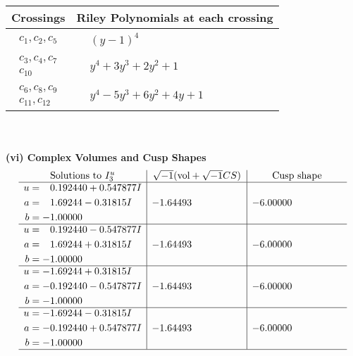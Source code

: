 \documentclass[1p]{elsarticle_modified}
\theoremstyle{definition}
\newcommand{\I}{\sqrt{-1}}
\begin{document}
\begin{tabular}{m{50pt}|m{274pt}}
Crossings & \hspace{64pt}Riley Polynomials at each crossing \\
\hline $$\begin{aligned}c_{1},c_{2},c_{5}\end{aligned}$$&$\begin{aligned}
&(y-1)^4
\end{aligned}$\\
\hline $$\begin{aligned}c_{3},c_{4},c_{7}\\c_{10}\end{aligned}$$&$\begin{aligned}
&y^4+3 y^3+2 y^2+1
\end{aligned}$\\
\hline $$\begin{aligned}c_{6},c_{8},c_{9}\\c_{11},c_{12}\end{aligned}$$&$\begin{aligned}
&y^4-5 y^3+6 y^2+4 y+1
\end{aligned}$\\
\hline
\end{tabular}\\~\\
\newpage\flushleft \textbf{(vi) Complex Volumes and Cusp Shapes}
$$\begin{array}{c|c|c}  
\text{Solutions to }I^u_{3}& \I (\text{vol} + \sqrt{-1}CS) & \text{Cusp shape}\\
 \hline 
\begin{aligned}
u &= \phantom{-}0.192440 + 0.547877 I \\
a &= \phantom{-}1.69244 - 0.31815 I \\
b &= -1.00000\phantom{ +0.000000I}\end{aligned}
 & -1.64493\phantom{ +0.000000I} & -6.00000\phantom{ +0.000000I} \\ \hline\begin{aligned}
u &= \phantom{-}0.192440 - 0.547877 I \\
a &= \phantom{-}1.69244 + 0.31815 I \\
b &= -1.00000\phantom{ +0.000000I}\end{aligned}
 & -1.64493\phantom{ +0.000000I} & -6.00000\phantom{ +0.000000I} \\ \hline\begin{aligned}
u &= -1.69244 + 0.31815 I \\
a &= -0.192440 - 0.547877 I \\
b &= -1.00000\phantom{ +0.000000I}\end{aligned}
 & -1.64493\phantom{ +0.000000I} & -6.00000\phantom{ +0.000000I} \\ \hline\begin{aligned}
u &= -1.69244 - 0.31815 I \\
a &= -0.192440 + 0.547877 I \\
b &= -1.00000\phantom{ +0.000000I}\end{aligned}
 & -1.64493\phantom{ +0.000000I} & -6.00000\phantom{ +0.000000I}\\
 \hline 
 \end{array}$$\newpage\newpage\renewcommand{\arraystretch}{1}
\end{document}
